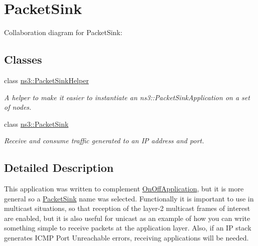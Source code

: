 \hypertarget{group__packetsink}{}\section{Packet\+Sink}
\label{group__packetsink}
Collaboration diagram for Packet\+Sink\+:
\subsection*{Classes}
\begin{DoxyCompactItemize}
\item 
class \hyperlink{classns3_1_1PacketSinkHelper}{ns3\+::\+Packet\+Sink\+Helper}
\begin{DoxyCompactList}\small\item\em A helper to make it easier to instantiate an ns3\+::\+Packet\+Sink\+Application on a set of nodes. \end{DoxyCompactList}\item 
class \hyperlink{classns3_1_1PacketSink}{ns3\+::\+Packet\+Sink}
\begin{DoxyCompactList}\small\item\em Receive and consume traffic generated to an IP address and port. \end{DoxyCompactList}\end{DoxyCompactItemize}


\subsection{Detailed Description}
This application was written to complement \hyperlink{classns3_1_1OnOffApplication}{On\+Off\+Application}, but it is more general so a \hyperlink{classns3_1_1PacketSink}{Packet\+Sink} name was selected. Functionally it is important to use in multicast situations, so that reception of the layer-\/2 multicast frames of interest are enabled, but it is also useful for unicast as an example of how you can write something simple to receive packets at the application layer. Also, if an IP stack generates I\+C\+MP Port Unreachable errors, receiving applications will be needed. 
